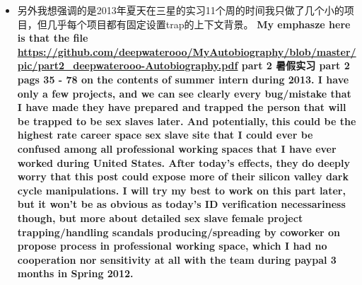 \documentclass[9pt, b5paper]{article}
\begin{document}
\begin{enumerate}
\begin{enumerate}
\begin{itemize}
\item 另外我想强调的是2013年夏天在三星的实习11个周的时间我只做了几个小的项目，但几乎每个项目都有固定设置trap的上下文背景。 \textbf{My emphasze here is that the file \url{https://github.com/deepwaterooo/MyAutobiography/blob/master/pic/part2\_deepwaterooo-Autobiography.pdf} part 2 暑假实习 part 2 pags 35 - 78 on the contents of summer intern during 2013. I have only a few projects, and we can see clearly every bug/mistake that I have made they have prepared and trapped the person that will be trapped to be sex slaves later. And potentially, this could be the highest rate career space sex slave site that I could ever be confused among all professional working spaces that I have ever worked during United States. After today's effects, they do deeply worry that this post could expose more of their silicon valley dark cycle manipulations. I will try my best to work on this part later, but it won't be as obvious as today's ID verification necessariness though, but more about detailed sex slave female project trapping/handling scandals producing/spreading by coworker on propose process in professional working space, which I had no cooperation nor sensitivity at all with the team during paypal 3 months in Spring 2012.}
\end{itemize}
\end{enumerate}


\end{enumerate}
\end{document}
